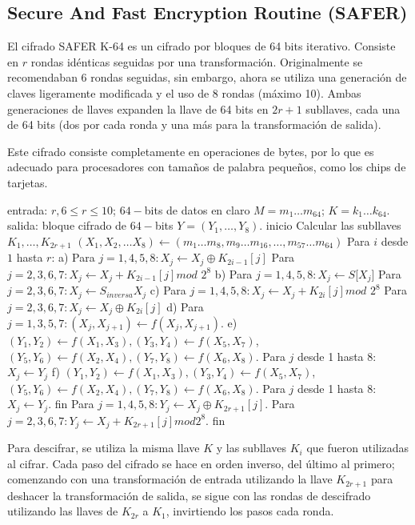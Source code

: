 \subsection{Secure And Fast Encryption Routine (SAFER)}

El cifrado SAFER K-64 es un cifrado por bloques de 64 bits iterativo.
Consiste en $r$ rondas idénticas seguidas por una transformación. 
Originalmente se recomendaban $6$ rondas seguidas, sin embargo, ahora
se utiliza una generación de claves ligeramente modificada y el uso de
$8$ rondas (máximo 10). Ambas generaciones de llaves expanden la llave
de 64 bits en $2r+1$ subllaves, cada una de 64 bits (dos por cada ronda
y una más para la transformación de salida).

Este cifrado consiste completamente en operaciones de bytes, por lo que
es adecuado para procesadores con tamaños de palabra pequeños, como los
chips de tarjetas.


\begin{pseudocodigo}[caption={SAFER K-64, cifrado.}, label={safer:1}]
  entrada: $r, 6\leq r \leq10$; $64-$bits de datos en claro $M = m_1 \dots m_64$; $ K = k_1 \dots k_{64}$.
  salida: bloque cifrado de $64-$bits $Y = (Y_1, \dots, Y_8)$.
  inicio
    Calcular las subllaves $K_1, \dots, K_{2r+1}$
    $(X_1, X_2, \dots X_8) \leftarrow (m_1 \dots m_8, m_9 \dots m_{16}, \dots, m_{57} \dots m_{64})$
    Para $i$ desde $1$ hasta $r$:
      a) Para $j = 1, 4, 5, 8: X_j \leftarrow X_j \oplus K_{2i-1}[j]$
        Para $j = 2, 3, 6, 7: X_j \leftarrow X_j + K_{2i-1}[j]$$mod$ $2^8$
      b) Para $j = 1, 4, 5, 8: X_j \leftarrow S$[$X_j$] 
        Para $j = 2, 3, 6, 7: X_j \leftarrow S_{inversa}X_j$
      c) Para $j = 1, 4, 5, 8: X_j \leftarrow X_j + K_{2i}[j]$$mod$ $2^8$
        Para $j = 2, 3, 6, 7: X_j \leftarrow X_j \oplus K_{2i}[j]$
      d) Para $j = 1, 3, 5, 7: (X_j, X_{j+1}) \leftarrow f(X_j, X_{j+1})$.
      e) $(Y_1, Y_2 ) \leftarrow f(X_1, X_3), (Y_3, Y_4 ) \leftarrow f(X_5, X_7)$,
        $(Y_5, Y_6 ) \leftarrow f(X_2, X_4), (Y_7, Y_8 ) \leftarrow f(X_6, X_8 )$.
        Para $j$ desde 1 hasta 8: $X_j \leftarrow Y_j$
      f) $(Y_1, Y_2) \leftarrow f(X_1, X_3), (Y_3, Y_4) \leftarrow f(X_5, X_7)$,
        $(Y_5, Y_6 ) \leftarrow f(X_2, X_4), (Y_7, Y_8) \leftarrow f(X_6, X_8)$.
        Para $j$ desde 1 hasta 8: $X_j \leftarrow Y_j$.
    fin
    Para $j = 1, 4, 5, 8: Y_j \leftarrow X_j \oplus K_{2r+1}[j]$. 
      Para $j = 2, 3, 6, 7: Y_j \leftarrow X_j + K_{2r+1} [j] mod 2^8$.
  fin
\end{pseudocodigo}

Para descifrar, se utiliza la misma llave $K$ y las subllaves $K_i$ 
que fueron utilizadas al cifrar. Cada paso del cifrado se hace en orden
inverso, del último al primero; comenzando con una transformación de entrada utilizando la llave $K_{2r+1}$ para deshacer la transformación de salida, se sigue con las rondas de descifrado utilizando las llaves de $K_{2r}$ a $K_1$, invirtiendo los pasos cada ronda.
